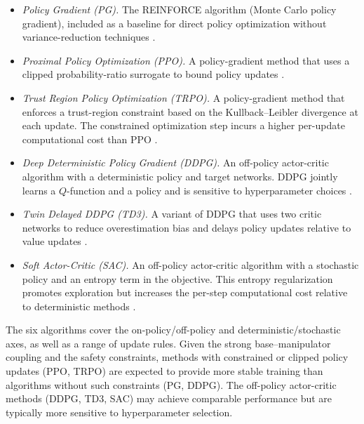 \documentclass{ieeeaccess}
\begin{document}
\begin{itemize}
  \item \textit{Policy Gradient (PG).} The REINFORCE algorithm (Monte Carlo policy gradient), included as
a baseline for direct policy optimization without variance-reduction techniques \cite{b7,b21}.
  \item \textit{Proximal Policy Optimization (PPO).} A policy-gradient method that uses a clipped
probability-ratio surrogate to bound policy updates \cite{b15}.
  \item \textit{Trust Region Policy Optimization (TRPO).} A policy-gradient method that enforces a trust-region
constraint based on the Kullback--Leibler divergence at each update. The constrained optimization step incurs
a higher per-update computational cost than PPO \cite{b14}.
  \item \textit{Deep Deterministic Policy Gradient (DDPG).} An off-policy actor-critic algorithm with a
deterministic policy and target networks. DDPG jointly learns a $Q$-function and a policy and
is sensitive to hyperparameter choices \cite{b16}.
  \item \textit{Twin Delayed DDPG (TD3).} A variant of DDPG that uses two critic networks
  to reduce overestimation bias and delays policy updates relative to value updates \cite{b17}.
  \item \textit{Soft Actor-Critic (SAC).} An off-policy actor-critic algorithm with a stochastic policy and an
  entropy term in the objective. This entropy regularization promotes exploration but increases the per-step
  computational cost relative to deterministic methods \cite{b18}.
\end{itemize}

The six algorithms cover the on-policy/off-policy and deterministic/stochastic axes, as well as a range
of update rules. Given the strong base--manipulator coupling and the safety constraints, methods with
constrained or clipped policy updates (PPO, TRPO) are expected to provide more stable training
than algorithms without such constraints (PG, DDPG). The off-policy actor-critic methods (DDPG, TD3, SAC)
may achieve comparable performance but are typically more sensitive to hyperparameter selection.
\end{document}
